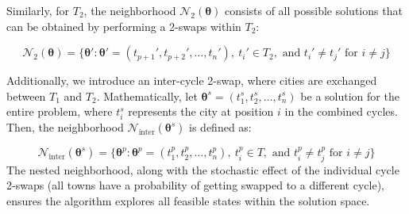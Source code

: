 Similarly, for $T_2$, the neighborhood \( \mathcal{N}_2(\boldsymbol{\theta}) \) consists of all possible solutions that can be obtained by performing a 2-swaps within $T_2$:

\[ \mathcal{N}_2(\boldsymbol{\theta}) = \{ \boldsymbol{\theta}' : \boldsymbol{\theta}' = (t_{p+1}', t_{p+2}', \ldots, t_n'), \ t_i' \in T_2, \text{ and } t_i' \neq t_j' \text{ for } i \neq j \} \]

Additionally, we introduce an inter-cycle 2-swap, where cities are exchanged between $T_1$ and $T_2$. Mathematically, let \( \boldsymbol{\theta}^s = (t_1^s, t_2^s, \ldots, t_n^s) \) be a solution for the entire problem, where \( t_i^s \) represents the city at position \( i \) in the combined cycles. Then, the neighborhood \( \mathcal{N}_{\text{inter}}(\boldsymbol{\theta}^s) \) is defined as:

\[ \mathcal{N}_{\text{inter}}(\boldsymbol{\theta}^s) = \{ \boldsymbol{\theta}^p : \boldsymbol{\theta}^p = (t_1^p, t_2^p, \ldots, t_n^p), \ t_i^p \in T, \text{ and } t_i^p \neq t_j^p \text{ for } i \neq j \} \]
The nested neighborhood, along with the stochastic effect of the individual cycle 2-swaps (all towns have a probability of getting swapped to a different cycle), ensures the algorithm explores all feasible states within the solution space.